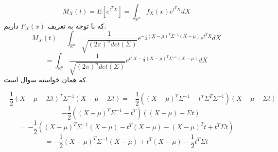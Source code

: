 \parte{}
\[M_X(t) = E[e^{t^{T}X}] = \int_{\mathbb{R}^{n}}{f_{X}(x) e^{t^{T}X}} dX \]
که با توجه به تعریف $F_X(x)$ داریم:
\[M_X(t) =  \int_{\mathbb{R}^{n}}{\frac{1}{\sqrt{(2\pi)^n det(\Sigma)}} e^{-\frac{1}{2}(X-\mu)^{T}\Sigma^{-1}(X-\mu)} e^{t^{T}X}} dX\]
\[ = \int_{\mathbb{R}^{n}}{\frac{1}{\sqrt{(2\pi)^n det(\Sigma)}} e^{t^{T}X-\frac{1}{2}(X-\mu)^{T}\Sigma^{-1}(X-\mu)}} dX \]
که همان خواسته سوال است.\\

\parte{}

\[ -\frac{1}{2}(X-\mu-\Sigma t)^{T}\Sigma^{-1}(X-\mu-\Sigma t) 
= -\frac{1}{2}((X-\mu)^{T}\Sigma^{-1}-t^{T}\Sigma^{T}\Sigma^{-1})(X-\mu-\Sigma t) \]
\[ 
= -\frac{1}{2}((X-\mu)^{T}\Sigma^{-1}-t^{T})((X-\mu)-\Sigma t) 
\]
\[ 
= -\frac{1}{2}((X-\mu)^{T}\Sigma^{-1}(X-\mu) -t^{T}(X-\mu) - (X-\mu)^{T}t +t^{T}\Sigma t)
\]
\[
= -\frac{1}{2}(X-\mu)^{T}\Sigma^{-1}(X-\mu) + t^{T}(X-\mu) -\frac{1}{2}t^{T}\Sigma t
\]
\parte{}
